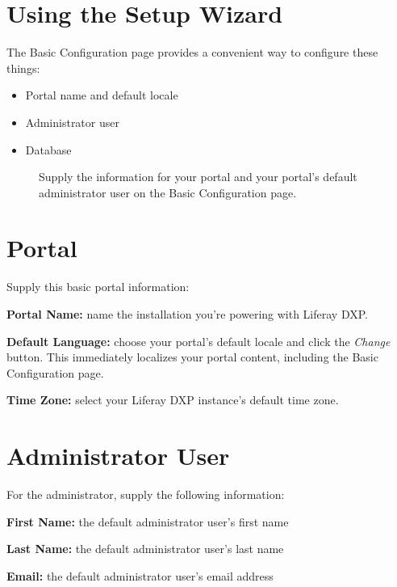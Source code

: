 \section{Using the Setup Wizard}\label{using-the-setup-wizard}

The Basic Configuration page provides a convenient way to configure
these things:

\begin{itemize}
\tightlist
\item
  Portal name and default locale
\item
  Administrator user
\item
  Database
\end{itemize}

\begin{figure}
\centering
{}
\caption{Supply the information for your portal and your portal's
default administrator user on the Basic Configuration page.}
\end{figure}

\section{Portal}\label{portal}

Supply this basic portal information:

\textbf{Portal Name:} name the installation you're powering with Liferay
DXP.

\textbf{Default Language:} choose your portal's default locale and click
the \emph{Change} button. This immediately localizes your portal
content, including the Basic Configuration page.

\textbf{Time Zone:} select your Liferay DXP instance's default time
zone.

\section{Administrator User}\label{administrator-user}

For the administrator, supply the following information:

\textbf{First Name:} the default administrator user's first name

\textbf{Last Name:} the default administrator user's last name

\textbf{Email:} the default administrator user's email address

\noindent\hrulefill

